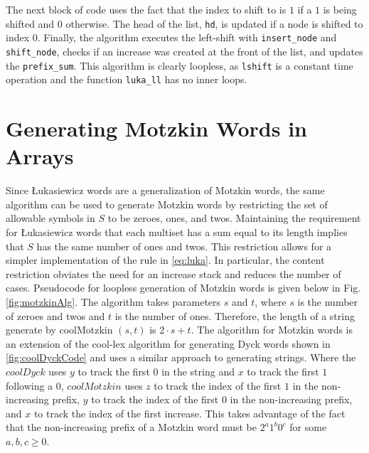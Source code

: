 The next block of code uses the fact that the index to shift to is $1$ if a $1$ is being shifted and $0$ otherwise.  The head of the list, \verb$hd$, is updated if a node is shifted to index 0.  Finally, the algorithm executes the left-shift with \verb$insert_node$ and \verb$shift_node$, checks if an increase was created at the front of the list, and updates the \verb$prefix_sum$.  This algorithm is clearly loopless, as \verb$lshift$ is a constant time operation and the function \verb$luka_ll$ has no inner loops.

\section{Generating Motzkin Words in Arrays}\label{sec:coolMotz}
Since Łukasiewicz words are a generalization of Motzkin words, the same algorithm can be used to generate Motzkin words by restricting the set of allowable symbols in $S$ to be zeroes, ones, and twos. Maintaining the requirement for Łukasiewicz words that each multiset has a sum equal to its length implies that $S$ has the same number of ones and twos.  This restriction allows for a simpler implementation of the rule in \eqref{eq:luka}.  In particular, the content restriction obviates the need for an increase stack and reduces the number of cases.   Pseudocode for loopless generation of Motzkin words is given below in Fig. \ref{fig:motzkinAlg}.
The algorithm takes parameters $s$ and $t$, where $s$ is the number of zeroes and twos and $t$ is the number of ones.  Therefore, the length of a string generate by coolMotzkin $(s,t)$ is $2\cdot s + t$.
The algorithm for Motzkin words is an extension of the cool-lex algorithm for generating Dyck words shown in \ref{fig:coolDyckCode} and uses a similar approach to generating strings.
Where the $coolDyck$ uses $y$ to track the first $0$ in the string and $x$ to track the first $1$ following a $0$, $coolMotzkin$ uses $z$ to track the index of the first $1$ in the non-increasing prefix, $y$ to track the index of the first $0$ in the non-increasing prefix, and $x$ to track the index of the first increase.  This takes advantage of the fact that the non-increasing prefix of a Motzkin word must be $2^a1^b0^c$ for some $a,b,c \ge 0$.


